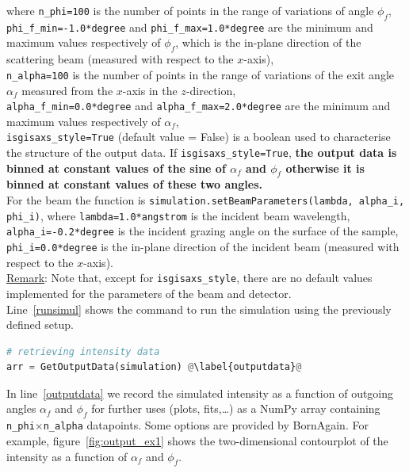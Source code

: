 \noindent where \texttt{n\_phi=100} is the number of points in the range of
variations of angle $\phi_f$,\\ \texttt{phi\_f\_min=-1.0*degree} and \texttt{phi\_f\_max=1.0*degree}
are the minimum and maximum values respectively of $\phi_f$, which is the in-plane direction of the scattering beam
(measured with respect to the $x$-axis), \\ \texttt{n\_alpha=100} is
the number of points in the range of variations of the exit angle
$\alpha_f$ measured from the $x$-axis in the $z$-direction,\\ \texttt{alpha\_f\_min=0.0*degree} and \texttt{alpha\_f\_max=2.0*degree} 
are the minimum and maximum values respectively of $\alpha_f$,\\
\texttt{isgisaxs\_style=True} (default value = False) is a boolean
used to characterise the structure of the output data. If
\texttt{isgisaxs\_style=True}, \textbf{ the output data is binned at constant
values of the sine of $\alpha_f$ and $\phi_f$ otherwise it is binned
at constant values of these two angles.}\\


\noindent For the beam the function is
\texttt{simulation.setBeamParameters(lambda, alpha\_i, phi\_i)}, where
\texttt{lambda=1.0*angstrom} is the incident beam wavelength,\\
\texttt{alpha\_i=-0.2*degree} is the incident
grazing angle on the surface of the sample,
\texttt{phi\_i=0.0*degree} is the in-plane
direction of the incident beam (measured with respect to the $x$-axis).\\ 

\noindent \underline{Remark}: Note that, except for
\texttt{isgisaxs\_style}, there are no default values implemented for the
parameters of the beam and detector.\\

\noindent Line~\ref{runsimul} shows the command to run the simulation using the
previously defined setup.


\begin{lstlisting}[language=python, style=eclipseboxed,name=ex1,nolol]
# retrieving intensity data
arr = GetOutputData(simulation) @\label{outputdata}@
\end{lstlisting}


\noindent In line~\ref{outputdata} we record the simulated intensity
as a function of outgoing angles $\alpha_f$ and $\phi_f$ for further
uses (plots, fits,\ldots) as a NumPy array containing
\texttt{n\_phi}$\times$\texttt{n\_alpha}
datapoints. Some options are provided by BornAgain. For example, figure~\ref{fig:output_ex1} shows the two-dimensional
contourplot of the intensity as a function of $\alpha_f$ and
$\phi_f$. 

